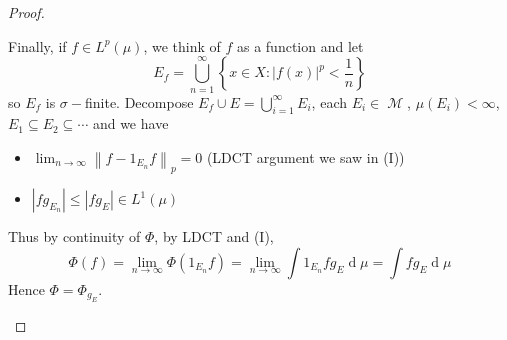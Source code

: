 \documentclass[12pt, a4paper]{memoir}
\newcommand{\norm}[1]{\ensuremath{\left\lVert#1\right\rVert}} %
\theoremstyle{nonumberplain}
\newtheorem{proof}{Proof}
\DeclareMathOperator{\M}{\mathcal{M}}
\renewcommand{\d}[1]{\ensuremath{\operatorname{d}\!{#1}}} %
\begin{document}
\begin{proof}
\begin{enumerate}[label=(\roman*)]
            Finally, if $f\in L^p(\mu)$, we think of $f$ as a function and let
            \begin{equation*}
                E_f=\bigcup_{n=1}^\infty\left\{x\in X:|f(x)|^p<\frac{1}{n}\right\}
            \end{equation*}
            so $E_f$ is $\sigma-$finite.
            Decompose $E_f\cup E=\bigcup_{i=1}^\infty E_i$, each $E_i\in\M$, $\mu(E_i)<\infty$, $E_1\subseteq E_2\subseteq\cdots$ and we have
            \begin{itemize}[nolistsep]
                \item $\lim_{n\to\infty}\norm{f-1_{E_n}f}_p=0$ (LDCT argument we saw in (I))
                \item $|fg_{E_n}|\leq|fg_E|\in L^1(\mu)$
            \end{itemize}
            Thus by continuity of $\Phi$, by LDCT and (I),
            \begin{equation*}
                \Phi(f)=\lim_{n\to\infty}\Phi(1_{E_n}f)=\lim_{n\to\infty}\int 1_{E_n}fg_E\d{\mu}=\int fg_E\d{\mu}
            \end{equation*}
            Hence $\Phi=\Phi_{g_E}$.
    \end{enumerate}
\end{proof}
\end{document}
